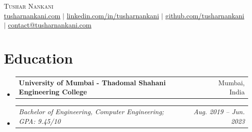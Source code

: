 \documentclass[letterpaper,10pt]{article}
\makeatletter
\newcommand{\resumeItem}[1]{
  \item\small{
    {#1 \vspace{-1pt}}
  }
}
\newcommand{\resumeSubheadingFirst}[2]{
  \vspace{-1pt}
  \item
    \begin{tabular*}{.97\textwidth}[t]{l@{\extracolsep{\fill}}r}
      \textbf{#1} & \small{#2}
    \end{tabular*}
    \vspace{-8pt}
}
\newcommand{\resumeSubheadingSecond}[2]{
  \item
    \begin{tabular*}{.97\textwidth}[t]{l@{\extracolsep{\fill}}r}
      \textit{\small#1} & \textit{\small #2}
    \end{tabular*}
    \vspace{-6pt}
}
\newcommand{\resumeSubHeadingListStart}{\begin{itemize}[leftmargin=0in, label={}]}
\newcommand{\resumeSubHeadingListEnd}{\end{itemize}}
\makeatother
\begin{document}

\begin{center}
    {\Huge \scshape Tushar Nankani} 
    \\ \vspace{4pt}
    \href{https://tusharnankani.com} 
    {tusharnankani.com}
    $|$ 
    \href{https://www.linkedin.com/in/tusharnankani} 
    {linkedin.com/in/tusharnankani}
    $|$
    \href{https://github.com/tusharnankani} 
    {github.com/tusharnankani}
    $|$ 
    \href{mailto:contact@tusharnankani.com}{contact@tusharnankani.com}  
\end{center}


%



\section{Education}
  \resumeSubHeadingListStart
    \resumeSubheadingFirst{University of Mumbai - Thadomal Shahani Engineering College}{Mumbai, India}
    \resumeSubheadingSecond{Bachelor of Engineering, Computer Engineering; GPA: 9.45/10}{Aug. 2019 -- Jun. 2023}
  \resumeSubHeadingListEnd
\end{document}
